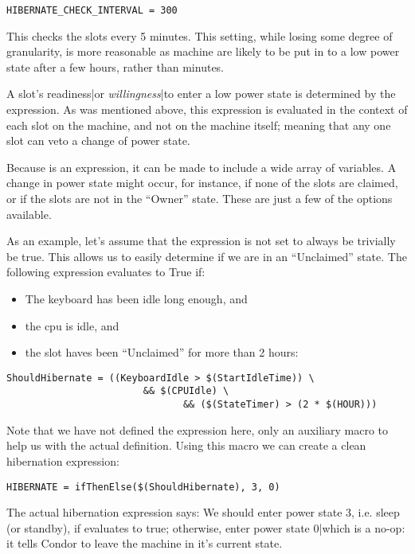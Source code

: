 \begin{verbatim}
HIBERNATE_CHECK_INTERVAL = 300
\end{verbatim}

This checks the slots every 5 minutes.  This setting, while losing some 
degree of granularity, is more reasonable as machine are likely to be put 
in to a low power state after a few hours, rather than minutes.
 
A slot's readiness|or \textit{willingness}|to enter a low power state is 
determined by the  expression.  As was mentioned above, this 
expression is evaluated in the context of each slot on the machine, and not 
on the machine itself; meaning that any one slot can veto a change of power 
state.  

Because  is an expression, it can be made to include a wide
array of variables.  A change in power state might occur, for instance, if 
none of the slots are claimed, or if the slots are not in the ``Owner'' state.
These are just a few of the options available.

As an example, let's assume that the  expression is not set to
always be trivially be true.  This allows us to easily determine if
we are in an ``Unclaimed'' state.  The following expression evaluates
to True if:

\begin{itemize}
\item The keyboard has been idle long enough, and
\item the cpu is idle, and
\item the slot haves been ``Unclaimed'' for more than 2 hours:
\end{itemize}

\begin{verbatim}
ShouldHibernate = ((KeyboardIdle > $(StartIdleTime)) \
                        && $(CPUIdle) \
                               && ($(StateTimer) > (2 * $(HOUR)))
\end{verbatim}

Note that we have not defined the  expression here, only an 
auxiliary macro to help us with the actual definition.  Using this macro we 
can create a clean hibernation expression:

\begin{verbatim}
HIBERNATE = ifThenElse($(ShouldHibernate), 3, 0)
\end{verbatim} %

The actual hibernation expression says: We should enter power state $3$,
i.e. sleep (or standby), if  evaluates to true; 
otherwise, enter power state $0$|which is a no-op: it tells Condor to leave 
the machine in it's current state. 

